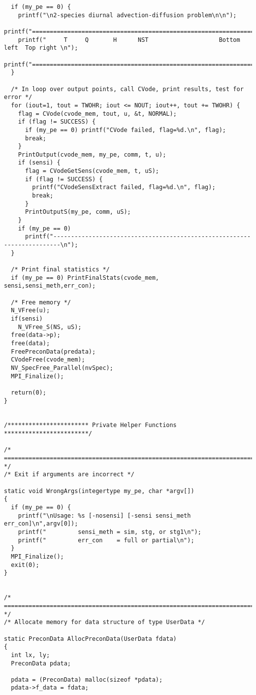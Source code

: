 \begin{verbatim}
  if (my_pe == 0) {
    printf("\n2-species diurnal advection-diffusion problem\n\n");
    printf("========================================================================\n");
    printf("     T     Q       H      NST                    Bottom left  Top right \n");
    printf("========================================================================\n");
  }

  /* In loop over output points, call CVode, print results, test for error */
  for (iout=1, tout = TWOHR; iout <= NOUT; iout++, tout += TWOHR) {
    flag = CVode(cvode_mem, tout, u, &t, NORMAL);
    if (flag != SUCCESS) {
      if (my_pe == 0) printf("CVode failed, flag=%d.\n", flag);
      break;
    }
    PrintOutput(cvode_mem, my_pe, comm, t, u);
    if (sensi) {
      flag = CVodeGetSens(cvode_mem, t, uS);
      if (flag != SUCCESS) { 
        printf("CVodeSensExtract failed, flag=%d.\n", flag); 
        break; 
      }
      PrintOutputS(my_pe, comm, uS);
    }
    if (my_pe == 0)
      printf("------------------------------------------------------------------------\n");
  }

  /* Print final statistics */  
  if (my_pe == 0) PrintFinalStats(cvode_mem, sensi,sensi_meth,err_con);

  /* Free memory */
  N_VFree(u);
  if(sensi) 
    N_VFree_S(NS, uS);
  free(data->p);  
  free(data);
  FreePreconData(predata);
  CVodeFree(cvode_mem);
  NV_SpecFree_Parallel(nvSpec);
  MPI_Finalize();

  return(0);
}


/*********************** Private Helper Functions ************************/

/* ======================================================================= */
/* Exit if arguments are incorrect */

static void WrongArgs(integertype my_pe, char *argv[])
{
  if (my_pe == 0) {
    printf("\nUsage: %s [-nosensi] [-sensi sensi_meth err_con]\n",argv[0]);
    printf("         sensi_meth = sim, stg, or stg1\n");
    printf("         err_con    = full or partial\n");
  }  
  MPI_Finalize();
  exit(0);
}


/* ======================================================================= */
/* Allocate memory for data structure of type UserData */

static PreconData AllocPreconData(UserData fdata)
{
  int lx, ly;
  PreconData pdata;

  pdata = (PreconData) malloc(sizeof *pdata);
  pdata->f_data = fdata;


\end{verbatim}
